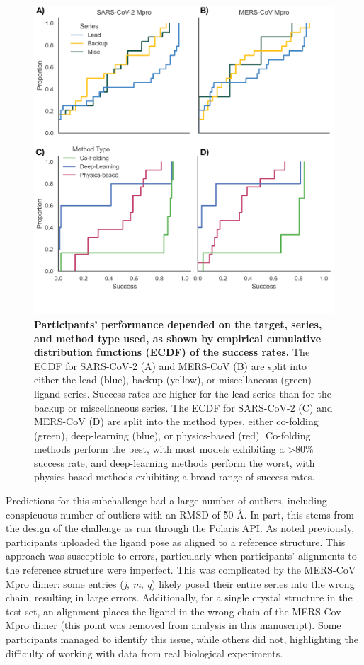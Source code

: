 \documentclass[journal=jcim,manuscript=article]{achemso}
\begin{document}
\begin{figure}
    \includegraphics[scale=1
    ]{04_figs_leaderboards/poses_by_series_and_method.png}
  \caption{\textbf{Participants' performance depended on the target, series, and method type used, as shown by empirical cumulative distribution functions (ECDF) of the success rates.} The ECDF for SARS-CoV-2 (A) and MERS-CoV (B) are  split into either the lead (blue), backup (yellow), or miscellaneous (green) ligand series. Success rates are higher for the lead series than for the backup or miscellaneous series. The ECDF for SARS-CoV-2 (C) and MERS-CoV (D) are  split into the method types, either co-folding (green), deep-learning (blue), or physics-based (red). Co-folding methods perform the best, with most models exhibiting a \textgreater 80\% success rate, and deep-learning methods perform the worst, with physics-based methods exhibiting a broad range of success rates.}
  \label{fgr:poses_by_series_and_method}
\end{figure}


Predictions for this subchallenge had a large number of outliers, including conspicuous number of outliers with an RMSD of \~50 Å. In part, this stems from the design of the challenge as run through the Polaris API. As noted previously, participants uploaded the ligand pose as aligned to a reference structure. This approach was susceptible to errors, particularly when participants’ alignments to the reference structure were imperfect. This was complicated by the MERS-CoV Mpro dimer: some entries (\textit{j}, \textit{m}, \textit{q}) likely posed their entire series into the wrong chain, resulting in large errors. Additionally, for a single crystal structure in the test set, an alignment places the ligand in the wrong chain of the MERS-Cov Mpro dimer (this point was removed from analysis in this manuscript). Some participants managed to identify this issue, while others did not, highlighting the difficulty of working with data from real biological experiments.
\end{document}
